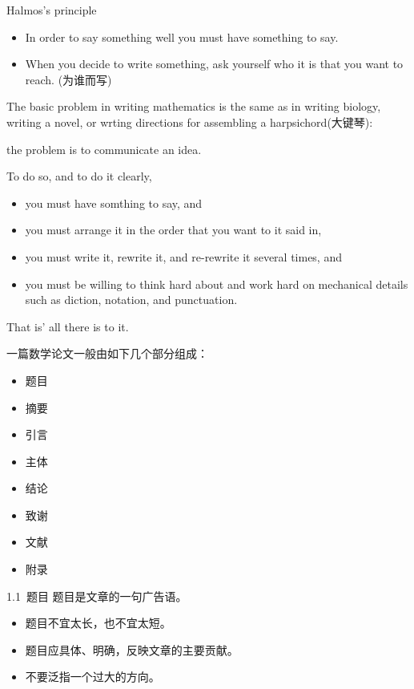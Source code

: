 \documentclass[13pt,fontset=mac]{ctexbeamer}
\begin{document}
\begin{frame}{Halmos's principle}
	\begin{itemize}
		\item  In order to say something well you must have something to say. 
		\item When you decide to write something, ask yourself who it is that you want to reach. (为谁而写)
	\end{itemize}

\vspace{8pt}
The basic problem in writing mathematics is the same as in writing biology, writing a novel, or wrting directions for assembling a harpsichord(大键琴): 
\begin{center}
the problem is \alert{to communicate an idea}.
\end{center}
To do so, and to do it clearly, 
\begin{itemize}
	\item you must have somthing to say, and 
	\item you must arrange it in the order that you want to it said in, 
	\item you must write it, rewrite it, and re-rewrite it  several times, and 
	\item you must be willing to think hard about and work hard on mechanical details such as diction, notation, and punctuation.
	\end{itemize}
That is' all there is to it.
\end{frame}
	
	
	
\begin{frame}
一篇数学论文一般由如下几个部分组成：
\begin{itemize}
\item 题目
\item 摘要
\item 引言
\item 主体
\item 结论
\item 致谢
\item 文献
\item 附录
\end{itemize}


\end{frame}

\begin{frame}{1.1~题目}
题目是文章的一句广告语。
\begin{itemize}
	\item 题目不宜太长，也不宜太短。
	\item 题目应具体、明确，反映文章的主要贡献。
	\item 不要泛指一个过大的方向。
\end{itemize}
\end{frame}
\end{document}
